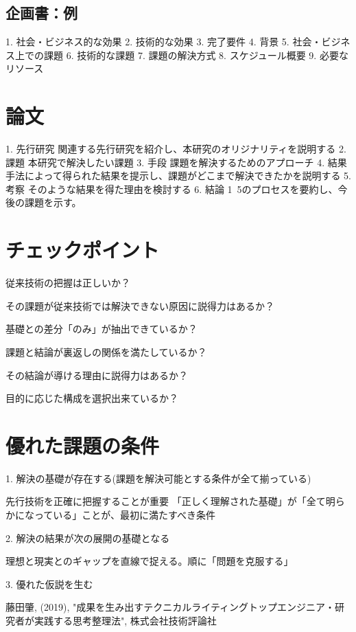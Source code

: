 \documentclass[uplatex, a4j]{jarticle}
\begin{document}
\subsection{企画書：例}

1. 社会・ビジネス的な効果
2. 技術的な効果
3. 完了要件
4. 背景
5. 社会・ビジネス上での課題
6. 技術的な課題
7. 課題の解決方式
8. スケジュール概要
9. 必要なリソース

\section{論文}
1. 先行研究
関連する先行研究を紹介し、本研究のオリジナリティを説明する
2. 課題
本研究で解決したい課題
3. 手段
課題を解決するためのアプローチ
4. 結果
手法によって得られた結果を提示し、課題がどこまで解決できたかを説明する
5. 考察
そのような結果を得た理由を検討する
6. 結論
1~5のプロセスを要約し、今後の課題を示す。

\section{チェックポイント}

従来技術の把握は正しいか？

その課題が従来技術では解決できない原因に説得力はあるか？

基礎との差分「のみ」が抽出できているか？

課題と結論が裏返しの関係を満たしているか？

その結論が導ける理由に説得力はあるか？

目的に応じた構成を選択出来ているか？

\section{優れた課題の条件}
1. 解決の基礎が存在する(課題を解決可能とする条件が全て揃っている)

先行技術を正確に把握することが重要
「正しく理解された基礎」が「全て明らかになっている」ことが、最初に満たすべき条件


2. 解決の結果が次の展開の基礎となる

理想と現実とのギャップを直線で捉える。順に「問題を克服する」

3. 優れた仮説を生む



\begin{thebibliography}{3}
  藤田肇, (2019), "成果を生み出すテクニカルライティングトップエンジニア・研究者が実践する思考整理法", 株式会社技術評論社
\end{thebibliography}
\end{document}
